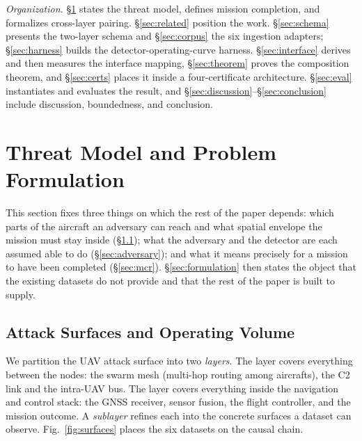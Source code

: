 \emph{Organization.}
\S\ref{sec:problem} states the threat model, defines mission completion, and formalizes cross-layer pairing. \S\ref{sec:related} position the work.
\S\ref{sec:schema} presents the two-layer schema and \S\ref{sec:corpus} the six
ingestion adapters; \S\ref{sec:harness} builds the detector-operating-curve
harness. \S\ref{sec:interface} derives and then measures the interface mapping,
\S\ref{sec:theorem} proves the composition theorem, and \S\ref{sec:certs}
places it inside a four-certificate architecture. \S\ref{sec:eval} instantiates
and evaluates the result, and
\S\ref{sec:discussion}--\S\ref{sec:conclusion} include discussion, boundedness, and conclusion. 

\section{Threat Model and Problem Formulation}
\label{sec:problem}
This section fixes three things on which the rest of the paper depends: which parts of
the aircraft an adversary can reach and what spatial envelope the mission must
stay inside (\S\ref{sec:surfaces}); what the adversary and the detector are each
assumed able to do (\S\ref{sec:adversary}); and what it means precisely for a mission to have been completed (\S\ref{sec:mcr}). \S\ref{sec:formulation} then
states the object that the existing datasets do not provide and that the rest of the
paper is built to supply.

\subsection{Attack Surfaces and Operating Volume}
\label{sec:surfaces}
We partition the UAV attack surface into two \emph{layers}. The \layernet{}
layer covers everything between the nodes: the swarm mesh (multi-hop routing among aircrafts), the C2 link and the intra-UAV bus. The \layerauto{} layer covers
everything inside the navigation and control stack: the GNSS receiver, sensor
fusion, the flight controller, and the mission outcome. A \emph{sublayer}
refines each into the concrete surfaces a dataset can observe.
Fig.~\ref{fig:surfaces} places the six datasets on the causal chain.


